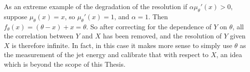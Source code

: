 As an extreme example of the degradation of the resolution if $\alpha\mu_\theta'(x)>0$, suppose $\mu_\theta(x)=x$, so $\mu_\theta'(x)=1$, and $\alpha=1$.
Then $f_\theta(x) = (\theta-x)+x = \theta$.
So after correcting for the dependence of $Y$ on $\theta$, all the correlation between $Y$ and $X$ has been removed, and the resolution of $Y$ given $X$ is therefore infinite.
In fact, in this case it makes more sense to simply use $\theta$ as the measurement of the jet energy and calibrate that with respect to $X$, an idea which is beyond the scope of this Thesis.
